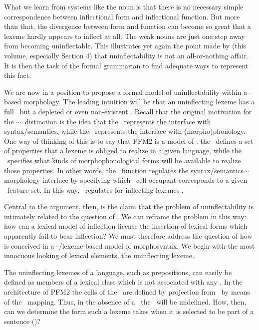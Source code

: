 \documentclass[output=paper,colorlinks,citecolor=brown]{langscibook}
\begin{document}
What we learn from  systems like the  noun  is that there is no necessary simple correspondence between inflectional form and inflectional function. But more than that, the divergence between form and function can become so great that a lexeme hardly appears to inflect at all. The  weak nouns are just one step away from becoming uninflectable. This illustrates yet again  the point made by \citeauthor{corbett2025} (this volume, especially Section 4) that uninflectability is not an all-or-nothing affair. It is  then the task of the formal grammarian to find adequate ways to represent this fact.

We are now in a position to propose a formal model of uninflectability within a -based morphology. The leading intuition will be that an uninflecting lexeme has a full \PC\ but a depleted or even non-existent \PF. Recall that the original motivation for the \PC$\sim$\PF\ distinction is the idea that the \PC\ represents the interface with syntax/semantics, while the \PF\ represents the interface with (morpho)phonology. One way of thinking of this is to say that PFM2 is a model of \emph{}: the \PC\ defines a set of properties that a lexeme is obliged to realize in a given language, while the \PF\ specifies what kinds of morphophonological forms will be available to realize those properties. In other words, the \Corr\ function regulates the syntax/semantics$\sim$morphology interface by specifying which \PF\ cell occupant corresponds to a given \PC\ feature set. In this way, \Corr\ regulates  for inflecting lexemes \citep[cf][27, 115]{stump2016}. 

Central to the argument, then, is the claim that the problem of uninflectability is intimately related to the question of . We can reframe the problem in this way: how can a lexical model of inflection license the insertion of lexical forms which apparently fail to bear inflection? We must therefore address the question of how  is conceived in a -/lexeme-based model of morphosyntax.  We begin with the most innocuous looking of lexical elements, the uninflecting lexeme. 

%
The uninflecting lexemes of a language, such as  prepositions, can easily be defined as members of a lexical class which is not associated with any \PC.  In the architecture of PFM2 the cells of the \PF\ are defined by projection from \PC\ by means of the \Corr\ mapping. Thus, in the absence of a \PC\ the \PF\ will be undefined. How, then, can we determine the form such a lexeme takes when it is selected to be part of a sentence ()?
\end{document}
